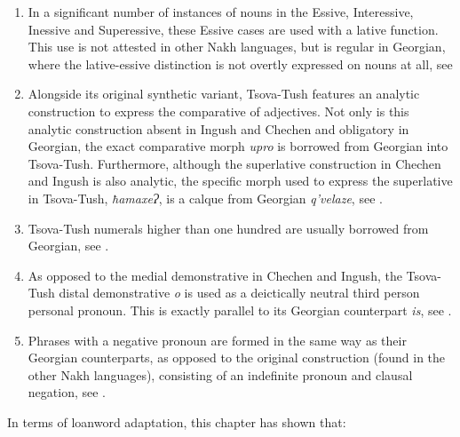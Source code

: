 \begin{enumerate}
	\item In a significant number of instances of nouns in the Essive, Interessive, Inessive and Superessive, these Essive cases are used with a lative function. This use is not attested in other Nakh languages, but is regular in Georgian, where the lative-essive distinction is not overtly expressed on nouns at all, see 
	
	\item  Alongside its original synthetic variant, Tsova-Tush features an analytic construction to express the comparative of adjectives. Not only is this analytic construction absent in Ingush and Chechen and obligatory in Georgian, the exact comparative morph \textit{upro} is borrowed from Georgian into Tsova-Tush. Furthermore, although the superlative construction in Chechen and Ingush is also analytic, the specific morph used to express the superlative in Tsova-Tush, \textit{ħamaxeɁ}, is a calque from Georgian \textit{q'velaze}, see .
	
	
	\item Tsova-Tush numerals higher than one hundred are usually borrowed from Georgian, see .
	
	
	\item As opposed to the medial demonstrative in Chechen and Ingush, the Tsova-Tush distal demonstrative \textit{o} is used as a deictically neutral third person personal pronoun. This is exactly parallel to its Georgian counterpart \textit{is}, see .
	
	\item Phrases with a negative pronoun are formed in the same way as their Georgian counterparts, as opposed to the original construction (found in the other Nakh languages), consisting of an indefinite pronoun and clausal negation, see .
\end{enumerate}

In terms of loanword adaptation, this chapter has shown that: 

